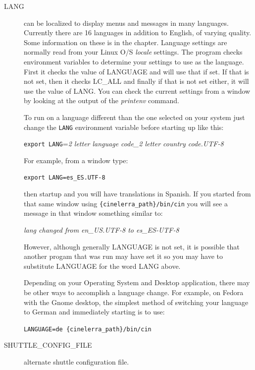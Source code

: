 \begin{description}
    \item[{\small LANG}] \CGG{} can be localized to display menus and messages in many languages.
Currently there are 16 languages in addition to English, of varying quality. Some information on
these is in the  chapter.
Language settings are normally read from your Linux O/S \textit{locale} settings. 
The \CGG{} program checks environment variables to determine your settings to use as the language.
First it checks the value of LANGUAGE and will use that if set.
If that is not set, then it checks 
LC\_ALL and finally if that is not set either, it will use the value of LANG. You can check the current
settings from a window by looking at the output of the \textit{printenv} command.

To run on a language different than the one selected on your system just change 
the \texttt{LANG} environment variable before starting up \CGG{} like this:

\hspace{2em} \texttt{export LANG}=\textit{2 letter language code\_2 letter country code.UTF-8} 

For example, from a window type:

\hspace{2em} \texttt{export LANG=es\_ES.UTF-8} 

then startup \CGG{} and you will have translations in Spanish.  If you started \CGG{} from that same
window using \texttt{\{cinelerra\_path\}/bin/cin} you will see a message in that window something similar to:

\hspace{2em}  \textit{lang changed from en\_US.UTF-8 to es\_ES-UTF-8}

However, although generally LANGUAGE is not set, it is possible that another progam that was run may
have set it so you may have to substitute LANGUAGE for the word LANG above.

Depending on your Operating System and Desktop application, there may be other ways to accomplish a
language change.  For example, on Fedora with the Gnome desktop, the simplest method of switching your
language to German and immediately starting \CGG{} is to use:

\hspace{2em} \texttt{LANGUAGE=de \{cinelerra\_path\}/bin/cin} 


    \item[{\small SHUTTLE\_CONFIG\_FILE}] alternate shuttle configuration file.
\end{description}

